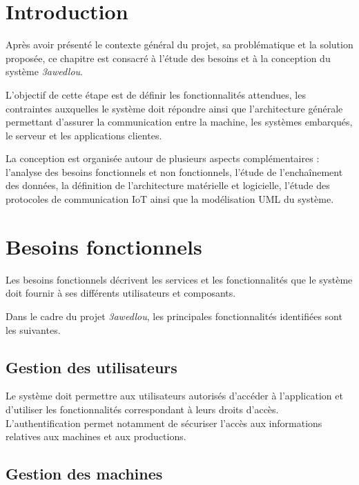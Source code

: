 
\section{Introduction}

Après avoir présenté le contexte général du projet, sa problématique et la
solution proposée, ce chapitre est consacré à l'étude des besoins et à la
conception du système \textit{3awedlou}.

L'objectif de cette étape est de définir les fonctionnalités attendues,
les contraintes auxquelles le système doit répondre ainsi que
l'architecture générale permettant d'assurer la communication entre la
machine, les systèmes embarqués, le serveur et les applications clientes.

La conception est organisée autour de plusieurs aspects complémentaires :
l'analyse des besoins fonctionnels et non fonctionnels, l'étude de
l'enchaînement des données, la définition de l'architecture matérielle et
logicielle, l'étude des protocoles de communication IoT ainsi que la
modélisation UML du système.

\section{Besoins fonctionnels}

Les besoins fonctionnels décrivent les services et les fonctionnalités que
le système doit fournir à ses différents utilisateurs et composants.

Dans le cadre du projet \textit{3awedlou}, les principales fonctionnalités
identifiées sont les suivantes.

\subsection{Gestion des utilisateurs}

Le système doit permettre aux utilisateurs autorisés d'accéder à
l'application et d'utiliser les fonctionnalités correspondant à leurs
droits d'accès. L'authentification permet notamment de sécuriser l'accès
aux informations relatives aux machines et aux productions.

\subsection{Gestion des machines}

